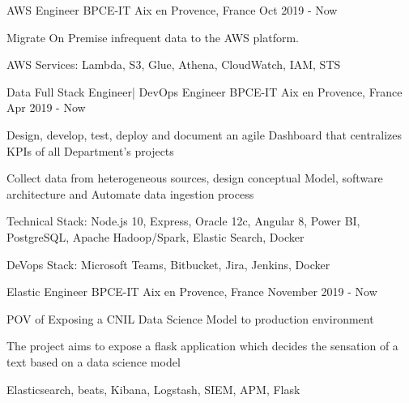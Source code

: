 

\begin{cventries}

  \cventry
    {AWS Engineer} %
    {BPCE-IT} %
    {Aix en Provence, France} %
    {Oct 2019 - Now} %
    {
      \begin{cvitems} %
       \item { Migrate On Premise infrequent data to the AWS platform.}
        \item {AWS Services: Lambda, S3, Glue, Athena, CloudWatch, IAM, STS}
      \end{cvitems}
    }
    
  \cventry
    {Data Full Stack Engineer| DevOps Engineer} %
    {BPCE-IT} %
    {Aix en Provence, France} %
    {Apr 2019 - Now} %
    {
      \begin{cvitems} %
       \item {Design, develop, test, deploy and document an agile Dashboard that centralizes KPIs of all Department's projects  }
       \item {Collect data from heterogeneous sources, design conceptual Model, software architecture and Automate data ingestion process}
        \item {Technical Stack: Node.js 10, Express,  Oracle 12c, Angular 8, Power BI, PostgreSQL, Apache Hadoop/Spark, Elastic Search, Docker}
        \item {DeVops Stack: Microsoft Teams, Bitbucket, Jira, Jenkins, Docker}
      \end{cvitems}
    }

  \cventry
    {Elastic Engineer} %
    {BPCE-IT} %
    {Aix en Provence, France} %
    {November 2019 - Now} %
    {
      \begin{cvitems} %
       \item {POV of Exposing a CNIL Data Science Model to production environment}
       \item {The project aims to expose a flask application which decides the sensation of a text based on a data science model}
        \item {Elasticsearch, beats, Kibana, Logstash, SIEM, APM, Flask }
      \end{cvitems}
    }


\end{cventries}
